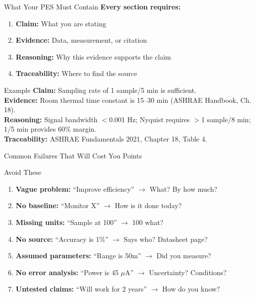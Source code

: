 \documentclass[aspectratio=169,11pt]{beamer}
\begin{document}
\begin{frame}{What Your PES Must Contain}
    \textbf{Every section requires:}
    
    \vspace{0.3cm}
    \begin{enumerate}
        \item \textbf{Claim:} What you are stating
        \item \textbf{Evidence:} Data, measurement, or citation
        \item \textbf{Reasoning:} Why this evidence supports the claim
        \item \textbf{Traceability:} Where to find the source
    \end{enumerate}
    
    \vspace{0.3cm}
    \begin{exampleblock}{Example}
        \textbf{Claim:} Sampling rate of 1 sample/5 min is sufficient.\\
        \textbf{Evidence:} Room thermal time constant is 15--30 min (ASHRAE Handbook, Ch. 18).\\
        \textbf{Reasoning:} Signal bandwidth $<$0.001 Hz; Nyquist requires $>$1 sample/8 min; 1/5 min provides 60\% margin.\\
        \textbf{Traceability:} ASHRAE Fundamentals 2021, Chapter 18, Table 4.
    \end{exampleblock}
\end{frame}

\begin{frame}{Common Failures That Will Cost You Points}
    \begin{alertblock}{Avoid These}
        \begin{enumerate}
            \item \textbf{Vague problem:} ``Improve efficiency'' $\rightarrow$ What? By how much?
            
            \item \textbf{No baseline:} ``Monitor X'' $\rightarrow$ How is it done today?
            
            \item \textbf{Missing units:} ``Sample at 100'' $\rightarrow$ 100 what?
            
            \item \textbf{No source:} ``Accuracy is 1\%'' $\rightarrow$ Says who? Datasheet page?
            
            \item \textbf{Assumed parameters:} ``Range is 50m'' $\rightarrow$ Did you measure?
            
            \item \textbf{No error analysis:} ``Power is 45 $\mu$A'' $\rightarrow$ Uncertainty? Conditions?
            
            \item \textbf{Untested claims:} ``Will work for 2 years'' $\rightarrow$ How do you know?
        \end{enumerate}
    \end{alertblock}
\end{frame}
\end{document}
